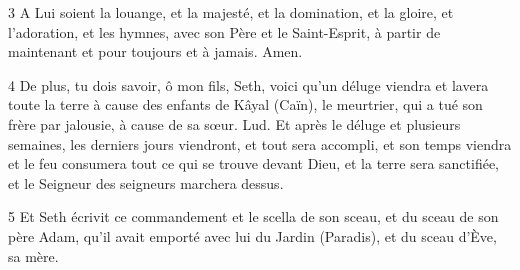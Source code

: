 \par 3 A Lui soient la louange, et la majesté, et la domination, et la gloire, et l'adoration, et les hymnes, avec son Père et le Saint-Esprit, à partir de maintenant et pour toujours et à jamais. Amen.

\par 4 De plus, tu dois savoir, ô mon fils, Seth, voici qu'un déluge viendra et lavera toute la terre à cause des enfants de Kâyal (Caïn), le meurtrier, qui a tué son frère par jalousie, à cause de sa sœur. Lud. Et après le déluge et plusieurs semaines, les derniers jours viendront, et tout sera accompli, et son temps viendra et le feu consumera tout ce qui se trouve devant Dieu, et la terre sera sanctifiée, et le Seigneur des seigneurs marchera dessus.

\par 5 Et Seth écrivit ce commandement et le scella de son sceau, et du sceau de son père Adam, qu'il avait emporté avec lui du Jardin (Paradis), et du sceau d'Ève, sa mère.

